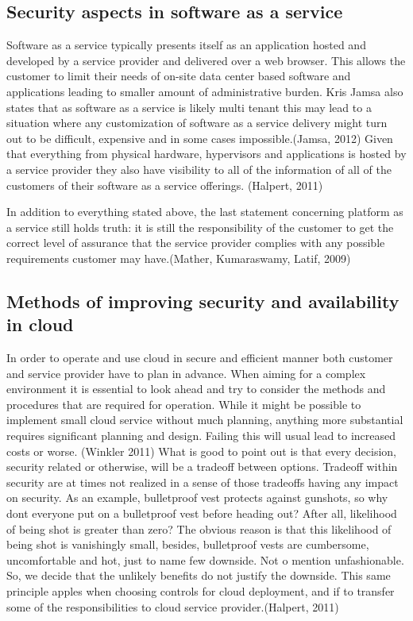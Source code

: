 \documentclass{article}
\begin{document}
\subsection{Security aspects in software as a service}
Software as a service typically presents itself as an application hosted and developed by a service provider and delivered over a web browser. This allows the customer to limit their needs of on-site data center based software and applications leading to smaller amount of administrative burden. Kris Jamsa also states that as software as a service is likely multi tenant this may lead to a situation where any customization of software as a service delivery might turn out to be difficult, expensive and in some cases impossible.(Jamsa, 2012)
Given that everything from physical hardware, hypervisors and applications is hosted by a service provider they also have visibility to all of the information of all of the customers of their software as a service offerings. (Halpert, 2011)
\par
In addition to everything stated above, the last statement concerning platform as a service still holds truth: it is still the responsibility of the customer to get the correct level of assurance that the service provider complies with any possible requirements customer may have.(Mather, Kumaraswamy, Latif, 2009)
\subsection{Methods of improving security and availability in cloud}
In order to operate and use cloud in secure and efficient manner both customer and service provider have to plan in advance. When aiming for a complex environment it is essential to look ahead and try to consider the methods and procedures that are required for operation. While it might be possible to implement small cloud service without much planning, anything more substantial requires significant planning and design. Failing this will usual lead to increased costs or worse. (Winkler 2011)
What is good to point out is that every decision, security related or otherwise, will be a tradeoff between options. Tradeoff within security are at times not realized in a sense of those tradeoffs having any impact on security. As an example, bulletproof vest protects against gunshots, so why dont everyone put on a bulletproof vest before heading out? After all, likelihood of being shot is greater than zero? The obvious reason is that this likelihood of being shot is vanishingly small, besides, bulletproof vests are cumbersome, uncomfortable and hot, just to name few downside. Not o mention unfashionable. So, we decide that the unlikely benefits do not justify the downside. This same principle apples when choosing controls for cloud deployment, and if to transfer some of the responsibilities to cloud service provider.(Halpert, 2011)  
\end{document}
